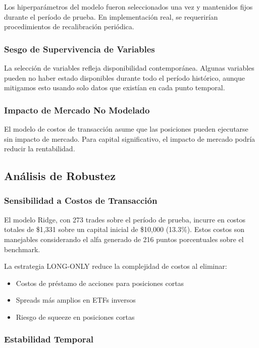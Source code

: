 \documentclass[11pt,a4paper]{article}
\begin{document}
Los hiperparámetros del modelo fueron seleccionados una vez y mantenidos fijos durante el período de prueba. En implementación real, se requerirían procedimientos de recalibración periódica.

\subsubsection{Sesgo de Supervivencia de Variables}

La selección de variables refleja disponibilidad contemporánea. Algunas variables pueden no haber estado disponibles durante todo el período histórico, aunque mitigamos esto usando solo datos que existían en cada punto temporal.

\subsubsection{Impacto de Mercado No Modelado}

El modelo de costos de transacción asume que las posiciones pueden ejecutarse sin impacto de mercado. Para capital significativo, el impacto de mercado podría reducir la rentabilidad.

\subsection{Análisis de Robustez}

\subsubsection{Sensibilidad a Costos de Transacción}

El modelo Ridge, con 273 trades sobre el período de prueba, incurre en costos totales de \$1,331 sobre un capital inicial de \$10,000 (13.3\%). Estos costos son manejables considerando el alfa generado de 216 puntos porcentuales sobre el benchmark.

La estrategia LONG-ONLY reduce la complejidad de costos al eliminar:
\begin{itemize}[noitemsep]
    \item Costos de préstamo de acciones para posiciones cortas
    \item Spreads más amplios en ETFs inversos
    \item Riesgo de squeeze en posiciones cortas
\end{itemize}

\subsubsection{Estabilidad Temporal}
\end{document}
